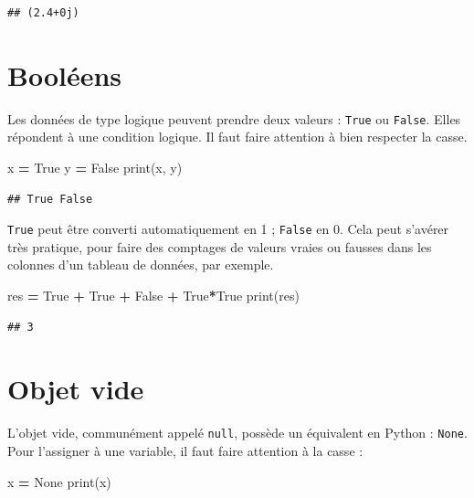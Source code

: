 \documentclass[12pt,]{book}
\newenvironment{Shaded}{\begin{snugshade}}{\end{snugshade}}
\newcommand{\VariableTok}[1]{\textcolor[rgb]{0.00,0.00,0.00}{#1}}
\newcommand{\OperatorTok}[1]{\textcolor[rgb]{0.81,0.36,0.00}{\textbf{#1}}}
\newcommand{\BuiltInTok}[1]{#1}
\newcommand{\NormalTok}[1]{#1}
\numberwithin{equation}{section}
\numberwithin{countremarque}{section}
\begin{document}
\begin{lstlisting}
## (2.4+0j)
\end{lstlisting}

\section{Booléens}\label{booleens}

Les données de type logique peuvent prendre deux valeurs : \texttt{True}
ou \texttt{False}. Elles répondent à une condition logique. Il faut
faire attention à bien respecter la casse.

\begin{Shaded}
\begin{Highlighting}[]
\NormalTok{x }\OperatorTok{=} \VariableTok{True}
\NormalTok{y }\OperatorTok{=} \VariableTok{False}
\BuiltInTok{print}\NormalTok{(x, y)}
\end{Highlighting}
\end{Shaded}

\begin{lstlisting}
## True False
\end{lstlisting}

\texttt{True} peut être converti automatiquement en 1 ; \texttt{False}
en 0. Cela peut s'avérer très pratique, pour faire des comptages de
valeurs vraies ou fausses dans les colonnes d'un tableau de données, par
exemple.

\begin{Shaded}
\begin{Highlighting}[]
\NormalTok{res }\OperatorTok{=} \VariableTok{True} \OperatorTok{+} \VariableTok{True} \OperatorTok{+} \VariableTok{False} \OperatorTok{+} \VariableTok{True}\OperatorTok{*}\VariableTok{True}
\BuiltInTok{print}\NormalTok{(res)}
\end{Highlighting}
\end{Shaded}

\begin{lstlisting}
## 3
\end{lstlisting}

\section{Objet vide}\label{objet-vide}

L'objet vide, communément appelé \texttt{null}, possède un équivalent en
Python : \texttt{None}. Pour l'assigner à une variable, il faut faire
attention à la casse :

\begin{Shaded}
\begin{Highlighting}[]
\NormalTok{x }\OperatorTok{=} \VariableTok{None}
\BuiltInTok{print}\NormalTok{(x)}
\end{Highlighting}
\end{Shaded}
\end{document}
